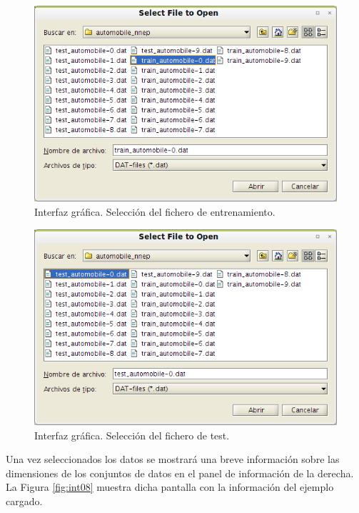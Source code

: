 		\begin{figure}[htbp]
			\centering
			\includegraphics[scale=0.6]{interfaz/interface06.png}
			\caption{Interfaz gráfica. Selección del fichero de entrenamiento.}
			\label{fig:int06}
		\end{figure}
		
		\begin{figure}[htbp]
			\centering
			\includegraphics[scale=0.6]{interfaz/interface07.png}
			\caption{Interfaz gráfica. Selección del fichero de test.}
			\label{fig:int07}
		\end{figure}
		
		Una vez seleccionados los datos se mostrará una breve información sobre las dimensiones de los conjuntos de datos en el panel de información de la derecha. La Figura \ref{fig:int08} muestra dicha pantalla con la información del ejemplo cargado. \\
		
